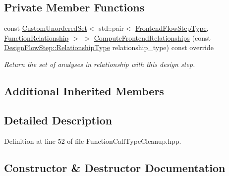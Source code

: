 \subsection*{Private Member Functions}
\begin{DoxyCompactItemize}
\item 
const \hyperlink{classCustomUnorderedSet}{Custom\+Unordered\+Set}$<$ std\+::pair$<$ \hyperlink{frontend__flow__step_8hpp_afeb3716c693d2b2e4ed3e6d04c3b63bb}{Frontend\+Flow\+Step\+Type}, \hyperlink{classFrontendFlowStep_af7cf30f2023e5b99e637dc2058289ab0}{Function\+Relationship} $>$ $>$ \hyperlink{classFunctionCallTypeCleanup_ab88bfd0f5cff395f19c8bf64f45a3657}{Compute\+Frontend\+Relationships} (const \hyperlink{classDesignFlowStep_a723a3baf19ff2ceb77bc13e099d0b1b7}{Design\+Flow\+Step\+::\+Relationship\+Type} relationship\+\_\+type) const override
\begin{DoxyCompactList}\small\item\em Return the set of analyses in relationship with this design step. \end{DoxyCompactList}\end{DoxyCompactItemize}
\subsection*{Additional Inherited Members}


\subsection{Detailed Description}


Definition at line 52 of file Function\+Call\+Type\+Cleanup.\+hpp.



\subsection{Constructor \& Destructor Documentation}
\mbox{\label{classFunctionCallTypeCleanup_a56e30cd0c90323c204d86cd4246358b5}} 
